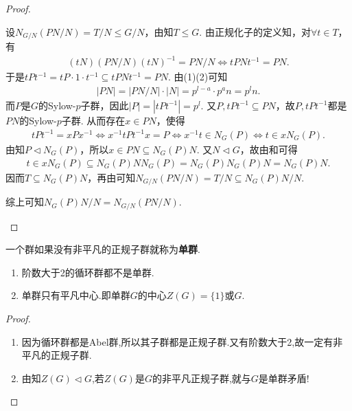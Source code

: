\documentclass[../../main.tex]{subfiles}%
\begin{document}
\begin{proof}
\begin{enumerate}[(1)]
设$N_{G/N}(PN/N)=T/N\leqslant G/N$，由知$T\leqslant G$. 由正规化子的定义知，对$\forall t\in T$，有
\begin{align*}
(tN)(PN/N)(tN)^{-1}=PN/N\Longleftrightarrow tPNt^{-1}=PN.
\end{align*}
于是$tPt^{-1}=tP\cdot 1\cdot t^{-1}\subseteq tPNt^{-1}=PN$. 由(1)(2)可知
\begin{align*}
|PN|=|PN/N|\cdot |N|=p^{l-a}\cdot p^an=p^ln.
\end{align*}
而$P$是$G$的Sylow-$p$子群，因此$|P|=|tPt^{-1}|=p^l$. 又$P,tPt^{-1}\subseteq PN$，故$P,tPt^{-1}$都是$PN$的Sylow-$p$子群. 从而存在$x\in PN$，使得
\begin{align*}
tPt^{-1}=xPx^{-1}\Longleftrightarrow x^{-1}tPt^{-1}x=P\Longleftrightarrow x^{-1}t\in N_G(P)\Longleftrightarrow t\in xN_G(P).
\end{align*}
由知$P\lhd N_G(P)$，所以$x\in PN\subseteq N_G(P)N$. 又$N\lhd G$，故由和可得
\begin{align*}
t\in xN_G(P)\subseteq N_G(P)NN_G(P)=N_G(P)N_G(P)N=N_G(P)N.
\end{align*}
因而$T\subseteq N_G(P)N$，再由可知$N_{G/N}(PN/N)=T/N\subseteq N_G(P)N/N$.

综上可知$N_G(P)N/N=N_{G/N}(PN/N)$.
\end{enumerate}
\end{proof}

\begin{definition}[单群]\label{definecolor:单群定义--抽象代数}
一个群如果没有非平凡的正规子群就称为\textbf{单群}.
\end{definition}

\begin{proposition}\label{proposition:阶数大于2的循环群必非单群}
\begin{enumerate}[(1)]
\item\label{proposition:阶数大于2的循环群必非单群-1} 阶数大于2的循环群都不是单群.

\item\label{proposition:阶数大于2的循环群必非单群-2} 单群只有平凡中心.即单群$G$的中心$Z(G)=\{1\}$或$G$.
\end{enumerate}
\end{proposition}
\begin{proof}
\begin{enumerate}[(1)]
\item 因为循环群都是Abel群,所以其子群都是正规子群.又有阶数大于2,故一定有非平凡的正规子群.

\item 由知$Z(G)\lhd G$,若$Z(G)$是$G$的非平凡正规子群,就与$G$是单群矛盾!
\end{enumerate}
\end{proof}
\end{document}
